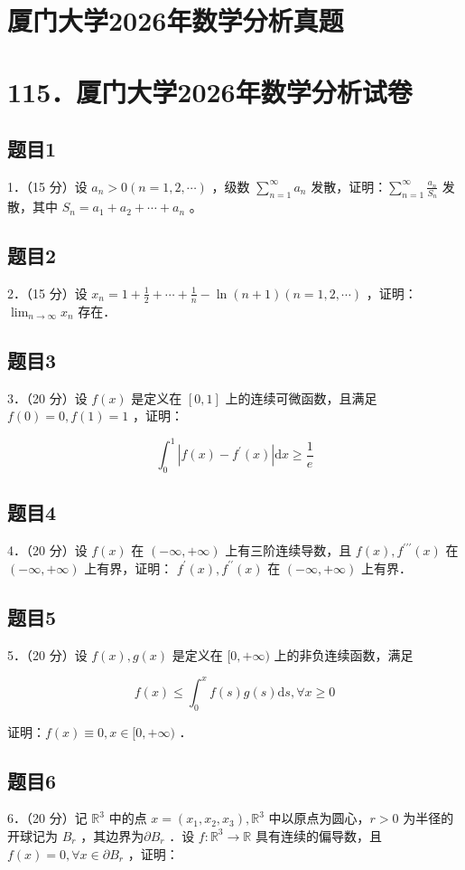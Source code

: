 \documentclass{article}
\begin{document}
\section*{厦门大学2026年数学分析真题}
\section*{115．厦门大学2026年数学分析试卷}

\subsection{题目1}
1．（15 分）设 \(a_{n}>0(n=1,2, \cdots)\) ，级数 \(\sum_{n=1}^{\infty} a_{n}\) 发散，证明：\(\sum_{n=1}^{\infty} \frac{a_{n}}{S_{n}}\) 发散，其中 \(S_{n}=a_{1}+a_{2}+\cdots+a_{n}\) 。

\subsection{题目2}
2．（15 分）设 \(x_{n}=1+\frac{1}{2}+\cdots+\frac{1}{n}-\ln (n+1)(n=1,2, \cdots)\) ，证明： \(\lim _{n \rightarrow \infty} x_{n}\) 存在．

\subsection{题目3}
3．（20 分）设 \(f(x)\) 是定义在 \([0,1]\) 上的连续可微函数，且满足 \(f(0)=0, f(1)=1\) ，证明：

\[
\int_{0}^{1}\left|f(x)-f^{\prime}(x)\right| \mathrm{d} x \geq \frac{1}{e}
\]

\subsection{题目4}
4．（20 分）设 \(f(x)\) 在 \((-\infty,+\infty)\) 上有三阶连续导数，且 \(f(x), f^{\prime \prime \prime}(x)\) 在 \((-\infty,+\infty)\) 上有界，证明： \(f^{\prime}(x), f^{\prime \prime}(x)\) 在 \((-\infty,+\infty)\) 上有界．

\subsection{题目5}
5．（20 分）设 \(f(x), g(x)\) 是定义在 \([0,+\infty)\) 上的非负连续函数，满足

\[
f(x) \leq \int_{0}^{x} f(s) g(s) \mathrm{d} s, \forall x \geq 0
\]

证明：\(f(x) \equiv 0, x \in[0,+\infty)\) ．

\subsection{题目6}
6．（20 分）记 \(\mathbb{R}^{3}\) 中的点 \(x=\left(x_{1}, x_{2}, x_{3}\right), \mathbb{R}^{3}\) 中以原点为圆心，\(r>0\) 为半径的开球记为 \(B_{r}\) ，其边界为\(\partial B_{r}\) ．设 \(f: \mathbb{R}^{3} \rightarrow \mathbb{R}\) 具有连续的偏导数，且 \(f(x)=0, \forall x \in \partial B_{r}\) ，证明：
\end{document}
